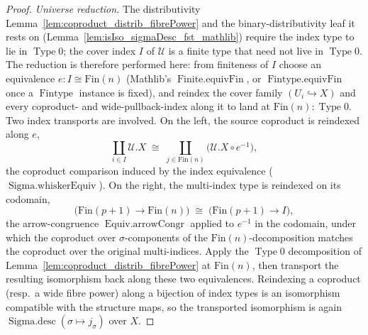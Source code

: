 \begin{proof}
  \emph{Universe reduction.} The distributivity Lemma~\ref{lem:coproduct_distrib_fibrePower} and the
  binary-distributivity leaf it rests on (Lemma~\ref{lem:isIso_sigmaDesc_fst_mathlib}) require the
  index type to lie in \(\operatorname{Type} 0\); the cover index \(I\) of \(\mathcal{U}\) is a
  finite type that need not live in \(\operatorname{Type} 0\). The reduction is therefore performed
  here: from finiteness of \(I\) choose an equivalence \(e : I \cong \mathrm{Fin}(n)\) (Mathlib's
  \(\operatorname{Finite.equivFin}\), or \(\operatorname{Fintype.equivFin}\) once a \(\operatorname{Fintype}\)
  instance is fixed), and reindex the cover family \((U_i \hookrightarrow X)\) and every coproduct- and
  wide-pullback-index along it to land at \(\mathrm{Fin}(n) : \operatorname{Type} 0\). Two index
  transports are involved. On the left, the source coproduct is reindexed along \(e\),
  \[
    \coprod_{i \in I} \mathcal{U}.X
      \;\cong\;
    \coprod_{j \in \mathrm{Fin}(n)} \bigl(\mathcal{U}.X \circ e^{-1}\bigr),
  \]
  the coproduct comparison induced by the index equivalence (\(\operatorname{Sigma.whiskerEquiv}\)).
  On the right, the multi-index type is reindexed on its codomain,
  \[
    \bigl(\mathrm{Fin}(p+1) \to \mathrm{Fin}(n)\bigr)
      \;\cong\;
    \bigl(\mathrm{Fin}(p+1) \to I\bigr),
  \]
  the arrow-congruence \(\operatorname{Equiv.arrowCongr}\) applied to \(e^{-1}\) in the codomain, under
  which the coproduct over \(\sigma\)-components of the \(\mathrm{Fin}(n)\)-decomposition matches the
  coproduct over the original multi-indices. Apply the \(\operatorname{Type} 0\) decomposition of
  Lemma~\ref{lem:coproduct_distrib_fibrePower} at \(\mathrm{Fin}(n)\), then transport the resulting
  isomorphism back along these two equivalences. Reindexing a coproduct (resp.\ a wide fibre power)
  along a bijection of index types is an isomorphism compatible with the structure maps, so the
  transported isomorphism is again \(\operatorname{Sigma.desc}(\sigma \mapsto j_\sigma)\) over \(X\).
\end{proof}

